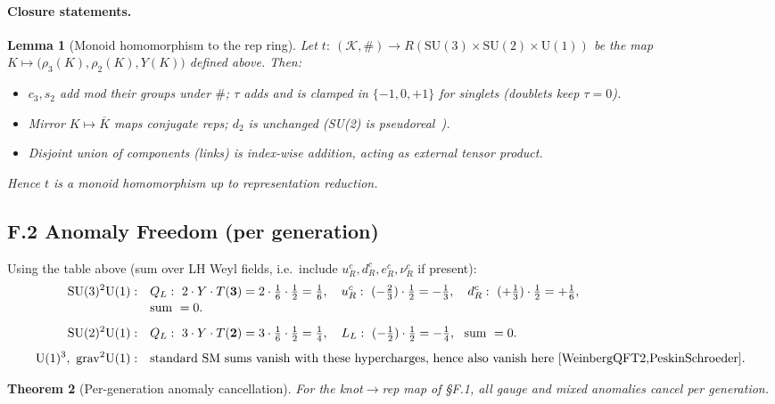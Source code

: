 \documentclass[11pt]{article}
\newtheorem{theorem}{Theorem}[section]
\newtheorem{lemma}[theorem]{Lemma}
\begin{document}
\paragraph{Closure statements.}
\begin{lemma}[Monoid homomorphism to the rep ring]
	Let $t:\ (\mathcal{K},\#)\to R(\mathrm{SU}(3)\times\mathrm{SU}(2)\times\mathrm{U}(1))$ be the map $K\mapsto \big(\rho_3(K),\rho_2(K),Y(K)\big)$ defined above. Then:
	\begin{itemize}
		\item $c_3,s_2$ add mod their groups under $\#$; $\tau$ adds and is clamped in $\{-1,0,+1\}$ for singlets (doublets keep $\tau=0$).
		\item Mirror $K\mapsto\overline{K}$ maps conjugate reps; $d_2$ is unchanged (SU(2) is pseudoreal~\cite{Witten1982}).
		\item Disjoint union of components (links) is index-wise addition, acting as external tensor product.
	\end{itemize}
	Hence $t$ is a monoid homomorphism up to representation reduction.
\end{lemma}

\subsection*{F.2 Anomaly Freedom (per generation)}

Using the table above (sum over LH Weyl fields, i.e.\ include $u_R^c,d_R^c,e_R^c,\nu_R^c$ if present):
\begin{align*}
	\mathrm{SU}(3)^2\mathrm U(1):\quad
	&Q_L:\ 2\cdot Y\cdot T(\mathbf 3)=2\cdot \tfrac{1}{6}\cdot \tfrac{1}{2}=\tfrac{1}{6},\quad
	u_R^c:\ (-\tfrac{2}{3})\cdot \tfrac{1}{2}=-\tfrac{1}{3},\quad
	d_R^c:\ (+\tfrac{1}{3})\cdot \tfrac{1}{2}=+\tfrac{1}{6},\\[-2pt]
	&\text{sum }=0.\\[4pt]
	\mathrm{SU}(2)^2\mathrm U(1):\quad
	&Q_L:\ 3\cdot Y\cdot T(\mathbf 2)=3\cdot \tfrac{1}{6}\cdot \tfrac{1}{2}=\tfrac{1}{4},\quad
	L_L:\ (-\tfrac{1}{2})\cdot \tfrac{1}{2}=-\tfrac{1}{4},\ \ \text{sum }=0.\\[4pt]
	\mathrm U(1)^3,\ \mathrm{grav}^2\mathrm U(1):\quad
	&\text{standard SM sums vanish with these hypercharges, hence also vanish here~\cite{WeinbergQFT2,PeskinSchroeder}.}
\end{align*}
\begin{theorem}[Per-generation anomaly cancellation]
	For the knot$\to$rep map of \S F.1, all gauge and mixed anomalies cancel per generation.
\end{theorem}
\end{document}
